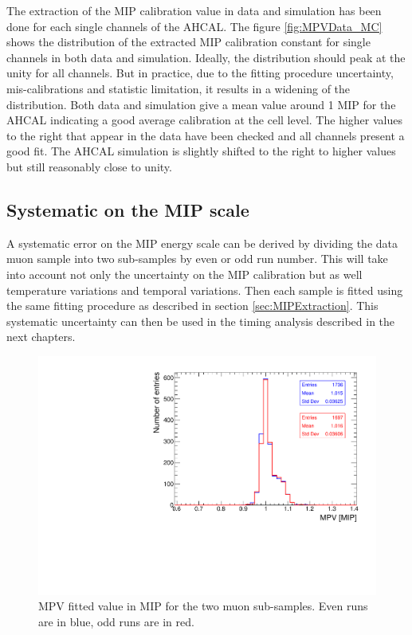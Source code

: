 The extraction of the MIP calibration value in data and simulation has been done for each single channels of the AHCAL. The figure \ref{fig:MPVData_MC} shows the distribution of the extracted MIP calibration constant for single channels in both data and simulation. Ideally, the distribution should peak at the unity for all channels. But in practice, due to the fitting procedure uncertainty, mis-calibrations and statistic limitation, it results in a widening of the distribution. Both data and simulation give a mean value around 1 MIP for the AHCAL indicating a good average calibration at the cell level. The higher values to the right that appear in the data have been checked and all channels present a good fit. The AHCAL simulation is slightly shifted to the right to higher values but still reasonably close to unity.

\subsection{Systematic on the MIP scale}

A systematic error on the MIP energy scale can be derived by dividing the data muon sample into two sub-samples by even or odd run number. This will take into account not only the uncertainty on the MIP calibration but as well temperature variations and temporal variations. Then each sample is fitted using the same fitting procedure as described in section \ref{sec:MIPExtraction}. This systematic uncertainty can then be used in the timing analysis described in the next chapters.

\begin{figure}[htbp!]
	\centering
	\includegraphics[width=0.7\linewidth]{../Thesis_Plots/EnergyCalib/Plots/SystematicMIP.pdf}
	\caption{MPV fitted value in MIP for the two muon sub-samples. Even runs are in blue, odd runs are in red.} \label{fig:MIPSyst}
\end{figure}


